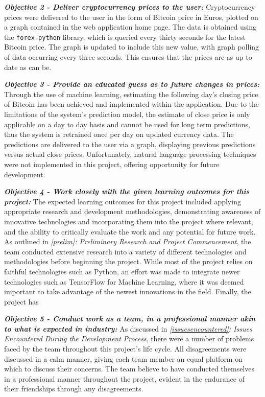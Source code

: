 \textit{\textbf{Objective 2 - Deliver cryptocurrency prices to the user:}} Cryptocurrency prices were delivered to the user in the form of Bitcoin price in Euros, plotted on a graph contained in the web application home page. The data is obtained using the \texttt{forex-python} library, which is queried every thirty seconds for the latest Bitcoin price. The graph is updated to include this new value, with graph polling of data occurring every three seconds. This ensures that the prices are as up to date as can be.

\textit{\textbf{Objective 3 - Provide an educated guess as to future changes in prices:}} Through the use of machine learning, estimating the following day's closing price of Bitcoin has been achieved and implemented within the application. Due to the limitations of the system's prediction model, the estimate of close price is only applicable on a day to day basis and cannot be used for long term predictions, thus the system is retrained once per day on updated currency data. The predictions are delivered to the user via a graph, displaying previous predictions versus actual close prices. Unfortunately, natural language processing techniques were not implemented in this project, offering opportunity for future development.

\textit{\textbf{Objective 4 - Work closely with the given learning outcomes for this project:}} The expected learning outcomes for this project included applying appropriate research and development methodologies, demonstrating awareness of innovative technologies and incorporating them into the project where relevant, and the ability to critically evaluate the work and any potential for future work. As outlined in \textit{\ref{prelim}: Preliminary Research and Project Commencement}, the team conducted extensive research into a variety of different technologies and methodologies before beginning the project. While most of the project relies on faithful technologies such as Python, an effort was made to integrate newer technologies such as TensorFlow for Machine Learning, where it was deemed important to take advantage of the newest innovations in the field. Finally, the project has 

\textit{\textbf{Objective 5 - Conduct work as a team, in a professional manner akin to what is expected in industry:}} As discussed in \textit{\ref{issuesencountered}: Issues Encountered During the Development Process}, there were a number of problems faced by the team throughout this project's life cycle. All disagreements were discussed in a calm manner, giving each team member an equal platform on which to discuss their concerns. The team believe to have conducted themselves in a professional manner throughout the project, evident in the endurance of their friendships through any disagreements. 
